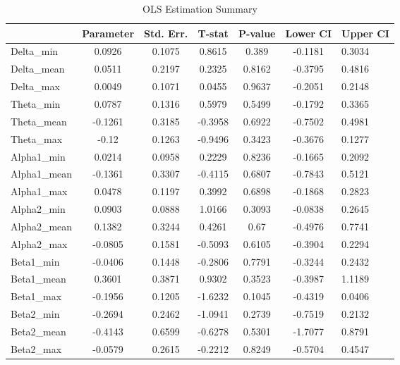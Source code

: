 \begin{table}[h]
    \centering
    \caption{OLS Estimation Summary}
    \label{tab:ols_summary}
    \begin{tabular}{l S[table-format=1.4] S[table-format=1.4] S[table-format=1.4] S[table-format=1.4] S[table-format=1.4]}
        \toprule
        & \textbf{Parameter} & \textbf{Std. Err.} & \textbf{T-stat} & \textbf{P-value} & \textbf{Lower CI} & \textbf{Upper CI} \\
        \midrule
        Delta_min & 0.0926 & 0.1075 & 0.8615 & 0.389 & -0.1181 & 0.3034 \\
        Delta_mean & 0.0511 & 0.2197 & 0.2325 & 0.8162 & -0.3795 & 0.4816 \\
        Delta_max & 0.0049 & 0.1071 & 0.0455 & 0.9637 & -0.2051 & 0.2148 \\
        Theta_min & 0.0787 & 0.1316 & 0.5979 & 0.5499 & -0.1792 & 0.3365 \\
        Theta_mean & -0.1261 & 0.3185 & -0.3958 & 0.6922 & -0.7502 & 0.4981 \\
        Theta_max & -0.12 & 0.1263 & -0.9496 & 0.3423 & -0.3676 & 0.1277 \\
        Alpha1_min & 0.0214 & 0.0958 & 0.2229 & 0.8236 & -0.1665 & 0.2092 \\
        Alpha1_mean & -0.1361 & 0.3307 & -0.4115 & 0.6807 & -0.7843 & 0.5121 \\
        Alpha1_max & 0.0478 & 0.1197 & 0.3992 & 0.6898 & -0.1868 & 0.2823 \\
        Alpha2_min & 0.0903 & 0.0888 & 1.0166 & 0.3093 & -0.0838 & 0.2645 \\
        Alpha2_mean & 0.1382 & 0.3244 & 0.4261 & 0.67 & -0.4976 & 0.7741 \\
        Alpha2_max & -0.0805 & 0.1581 & -0.5093 & 0.6105 & -0.3904 & 0.2294 \\
        Beta1_min & -0.0406 & 0.1448 & -0.2806 & 0.7791 & -0.3244 & 0.2432 \\
        Beta1_mean & 0.3601 & 0.3871 & 0.9302 & 0.3523 & -0.3987 & 1.1189 \\
        Beta1_max & -0.1956 & 0.1205 & -1.6232 & 0.1045 & -0.4319 & 0.0406 \\
        Beta2_min & -0.2694 & 0.2462 & -1.0941 & 0.2739 & -0.7519 & 0.2132 \\
        Beta2_mean & -0.4143 & 0.6599 & -0.6278 & 0.5301 & -1.7077 & 0.8791 \\
        Beta2_max & -0.0579 & 0.2615 & -0.2212 & 0.8249 & -0.5704 & 0.4547 \\

\end{tabular}
\end{table}
